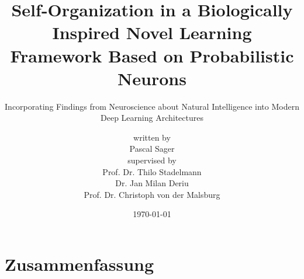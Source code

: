 \documentclass[
    fontsize=10pt,
    twoside=true,
    numbers=noenddot
]{cls/phdbyphd}
\theoremstyle{plain}
\begin{document}

\titlehead{Master of Science in Engineering with Specialisation in Data Science}

\subject{Master Thesis}
\title[Self-Organization in a Biologically Inspired Novel Learning Framework Based on Probabilistic Neurons]{Self-Organization in a Biologically Inspired Novel Learning Framework Based on Probabilistic Neurons}
\subtitle{Incorporating Findings from Neuroscience about Natural Intelligence into Modern Deep Learning Architectures}

\author[Pascal Sager]{{\small written by}\\Pascal Sager\\[1ex]  {\small supervised by}\\{\large Prof. Dr. Thilo Stadelmann}\\{\large Dr. Jan Milan Deriu}\\{\large Prof. Dr. Christoph von der Malsburg}\\[4ex]}

\date{\today}

\publishers{Zurich University of Applied Sciences\\Centre for Artificial intelligence}

\frontmatter
{}


\maketitle


\setlength{\textheight}{23cm}

\chapter*{Zusammenfassung}
    
    
\end{document}
